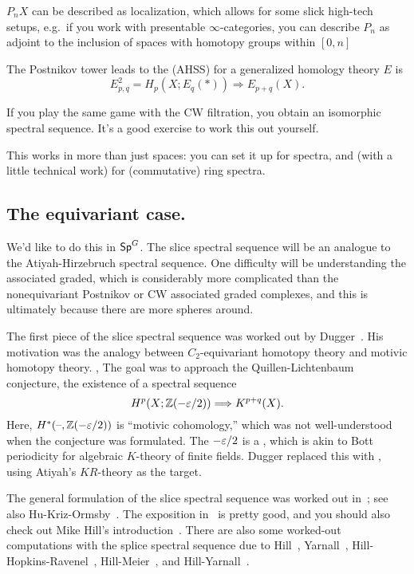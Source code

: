 $P_nX$ can be described as localization, which allows for some slick high-tech setups, e.g.\ if you work with
presentable $\infty$-categories, you can describe $P_n$ as adjoint to the inclusion of spaces with homotopy groups
within $[0,n]$

The Postnikov tower leads to the  (AHSS) for a generalized homology
theory $E$ is
\[E_{p,q}^2 = H_p(X; E_q(*))\Longrightarrow E_{p+q}(X).\]
\begin{ex}
If you play the same game with the CW filtration, you obtain an isomorphic spectral sequence. It's a good exercise
to work this out yourself.
\end{ex}
This works in more than just spaces: you can set it up for spectra, and (with a little technical work) for
(commutative) ring spectra.
\subsection*{The equivariant case.}
We'd like to do this in $\mathsf{Sp}^G$. The slice spectral sequence will be an analogue to the Atiyah-Hirzebruch spectral
sequence. One difficulty will be understanding the associated graded, which is considerably more complicated than
the nonequivariant Postnikov or CW associated graded complexes, and this is ultimately because there are more
spheres around.

The first piece of the slice spectral sequence was worked out by Dugger~\cite{DuggerKR}. His motivation was the
analogy between $C_2$-equivariant homotopy theory and motivic homotopy theory.  , The goal was to approach the Quillen-Lichtenbaum conjecture, the existence of a spectral sequence
\[H^p(X; \mathbb Z(-\varepsilon/2))\Longrightarrow K^{p+q}(X).\]
Here, $H^*(\text{--},\mathbb Z(-\varepsilon/2))$ is ``motivic cohomology,'' which was not well-understood when the conjecture was
formulated. The $-\varepsilon/2$ is a , which is akin to Bott periodicity for algebraic $K$-theory of
finite fields. Dugger replaced this with \TODO, using Atiyah's $KR$-theory as the target.

The general formulation of the slice spectral sequence was worked out in~\cite{HHR}; see also
Hu-Kriz-Ormsby~\cite{HKO11}. The exposition in~\cite{HHR} is pretty good, and you should also check out Mike Hill's
introduction~\cite{HillSlice}.  There are also some worked-out computations with the splice spectral sequence due
to Hill~\cite{HillRealBordism}, Yarnall~\cite{Yarnall}, Hill-Hopkins-Ravenel~\cite{HHR_HZ, HHR_C4},
Hill-Meier~\cite{HillMeier}, and Hill-Yarnall~\cite{HillYarnall}.

